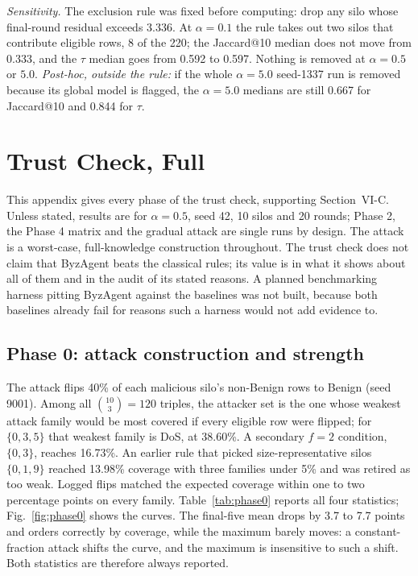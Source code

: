 \emph{Sensitivity.} The exclusion rule was fixed before computing: drop any silo whose
final-round residual exceeds 3.336. At $\alpha=0.1$ the rule takes out two silos that %
contribute eligible rows, 8 of the 220; the Jaccard@10 median does not move from 0.333, %
and the $\tau$ median goes from 0.592 to 0.597. %
Nothing is removed at $\alpha=0.5$ or $5.0$. \emph{Post-hoc, outside the rule:} %
if the whole $\alpha=5.0$ seed-1337 run is removed because its global model is flagged, %
the $\alpha=5.0$ medians are still 0.667 for Jaccard@10 and 0.844 for $\tau$. %

\section{Trust Check, Full}
\label{app:trust}
This appendix gives every phase of the trust check, supporting Section~VI-C. Unless
stated, results are for $\alpha=0.5$, seed 42, 10 silos and 20 rounds; Phase 2, the %
Phase 4 matrix and the gradual attack are single runs by design. The attack is a
worst-case, full-knowledge construction throughout. The trust check does not claim that
ByzAgent beats the classical rules; its value is in what it shows about all of them and
in the audit of its stated reasons. A planned benchmarking harness pitting ByzAgent
against the baselines was not built, because both baselines already fail for reasons
such a harness would not add evidence to.

\subsection{Phase 0: attack construction and strength}
The attack flips 40\% of each malicious silo's non-Benign rows to Benign (seed 9001). %
Among all $\binom{10}{3}=120$ triples, the attacker set is the one whose weakest %
attack family would be most covered if every eligible row were flipped; for
$\{0,3,5\}$ that weakest family is DoS, at 38.60\%. %
A secondary $f=2$ condition, $\{0,3\}$, reaches 16.73\%. An %
earlier rule that picked size-representative silos $\{0,1,9\}$ reached 13.98\% coverage %
with three families under 5\% and was retired as too weak. Logged flips matched the %
expected coverage within one to two percentage points on every family.
Table~\ref{tab:phase0} reports all four statistics; Fig.~\ref{fig:phase0} shows the
curves. The final-five mean drops by 3.7 to 7.7 points and orders correctly by coverage, %
while the maximum barely moves: a constant-fraction attack shifts the curve, and the
maximum is insensitive to such a shift. Both statistics are therefore always reported.

